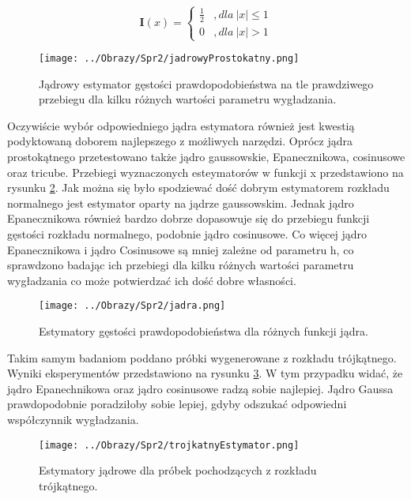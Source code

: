 \documentclass[12pt,a4paper]{article}
\begin{document}
\begin{equation}\label{eq:jadroProstokatne}
\textbf{I}(x) = \begin{cases} \frac{1}{2} &,dla\ |x| \le 1 \\ 0 &,dla\ |x|>1 \end{cases} 
\end{equation}

\begin{figure}[H]
\centering
\texttt{[image: ../Obrazy/Spr2/jadrowyProstokatny.png]} 
\caption{Jądrowy estymator gęstości prawdopodobieństwa na tle prawdziwego przebiegu dla kilku różnych wartości parametru wygładzania.}
\label{fig:jadrowyProstokatny}
\end{figure}

Oczywiście wybór odpowiedniego jądra estymatora również jest kwestią podyktowaną doborem najlepszego z możliwych narzędzi.
Oprócz jądra prostokątnego przetestowano także jądro gaussowskie, Epanecznikowa, cosinusowe oraz tricube.
Przebiegi wyznaczonych esteymatorów w funkcji x przedstawiono na rysunku \ref{fig:jadra}.
Jak można się było spodziewać dość dobrym estymatorem rozkładu normalnego jest estymator oparty na jądrze gaussowskim.
Jednak jądro Epanecznikowa również bardzo dobrze dopasowuje się do przebiegu funkcji gęstości rozkładu normalnego, podobnie jądro cosinusowe.
Co więcej jądro Epanecznikowa i jądro Cosinusowe są mniej zależne od parametru h, co sprawdzono badając ich przebiegi dla kilku różnych wartości parametru wygładzania co może potwierdzać ich dość dobre własności. 

\begin{figure}[H]
\centering
\texttt{[image: ../Obrazy/Spr2/jadra.png]} 
\caption{Estymatory gęstości prawdopodobieństwa dla różnych funkcji jądra.}
\label{fig:jadra}
\end{figure}

Takim samym badaniom poddano próbki wygenerowane z rozkładu trójkątnego.
Wyniki eksperymentów przedstawiono na rysunku \ref{fig:trjkatny}.
W tym przypadku widać, że jądro Epanechnikowa oraz jądro cosinusowe radzą sobie najlepiej.
Jądro Gaussa prawdopodobnie poradziłoby sobie lepiej, gdyby odszukać odpowiedni współczynnik wygładzania.

\begin{figure}[H]
\centering
\texttt{[image: ../Obrazy/Spr2/trojkatnyEstymator.png]} 
\caption{Estymatory jądrowe dla próbek pochodzących z rozkładu trójkątnego.}
\label{fig:trjkatny}
\end{figure}
\end{document}
